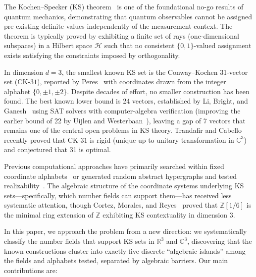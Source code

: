 \documentclass[12pt,a4paper]{article}
\newcommand{\R}{\mathbb{R}}
\newcommand{\C}{\mathbb{C}}
\newcommand{\Z}{\mathbb{Z}}
\newcommand{\CK}{\mathrm{CK}\text{-}31}
\begin{document}
The Kochen--Specker (KS) theorem~\cite{KochenSpecker1967} is one of the foundational no-go results of quantum mechanics, demonstrating that quantum observables cannot be assigned pre-existing definite values independently of the measurement context. The theorem is typically proved by exhibiting a finite set of rays (one-dimensional subspaces) in a Hilbert space $\mathcal{H}$ such that no consistent $\{0,1\}$-valued assignment exists satisfying the constraints imposed by orthogonality.

In dimension $d = 3$, the smallest known KS set is the Conway--Kochen 31-vector set ($\CK$), reported by Peres~\cite{Peres1993} with coordinates drawn from the integer alphabet $\{0, \pm 1, \pm 2\}$. Despite decades of effort, no smaller construction has been found. The best known lower bound is 24 vectors, established by Li, Bright, and Ganesh~\cite{LiBrightGanesh2024} using SAT solvers with computer-algebra verification (improving the earlier bound of 22 by Uijlen and Westerbaan~\cite{UijlenWesterbaan2016}), leaving a gap of 7 vectors that remains one of the central open problems in KS theory. Trandafir and Cabello~\cite{TrandafirCabello2025} recently proved that $\CK$ is rigid (unique up to unitary transformation in $\C^3$) and conjectured that 31 is optimal.

Previous computational approaches have primarily searched within fixed coordinate alphabets~\cite{Peres1991, Pavicic2004} or generated random abstract hypergraphs and tested realizability~\cite{LiBrightGanesh2024}. The algebraic structure of the coordinate systems underlying KS sets---specifically, which number fields can support them---has received less systematic attention, though Cortez, Morales, and Reyes~\cite{CortezMoralesReyes2022} proved that $\Z[1/6]$ is the minimal ring extension of $\Z$ exhibiting KS contextuality in dimension 3.

In this paper, we approach the problem from a new direction: we systematically classify the number fields that support KS sets in $\R^3$ and $\C^3$, discovering that the known constructions cluster into exactly five discrete ``algebraic islands'' among the fields and alphabets tested, separated by algebraic barriers. Our main contributions are:
\end{document}
